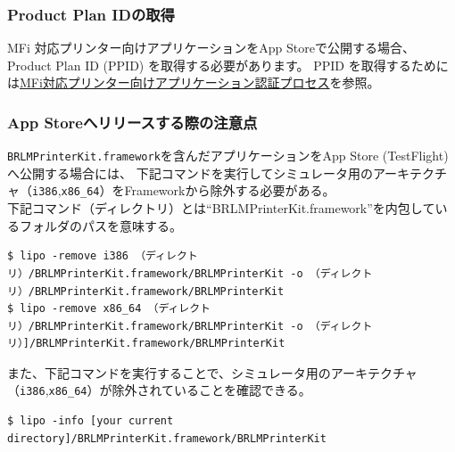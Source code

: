 \documentclass[dvipdfmx,jb5]{jreport}
\newcommand{\link}[2]{\href{#2}{#1}}
\newcommand{\terlogy}[2][|]{\colorbox{terlogy}{\texttt{\lstinline#1#2#1}}}
\begin{document}
\subsubsection{Product Plan IDの取得}
MFi 対応プリンター向けアプリケーションをApp Storeで公開する場合、Product Plan ID (PPID) を取得する必要があります。 PPID を取得するためには\link{MFi対応プリンター向けアプリケーション認証プロセス}{https://online.brother.co.jp/dev/MFiTop.aspx}を参照。
\subsubsection{App Storeへリリースする際の注意点}
\texttt{BRLMPrinterKit.framework}を含んだアプリケーションをApp Store (TestFlight)へ公開する場合には、 下記コマンドを実行してシミュレータ用のアーキテクチャ（\terlogy{i386},\terlogy{x86_64}）をFrameworkから除外する必要がある。\\
下記コマンド（ディレクトリ）とは``BRLMPrinterKit.framework''を内包しているフォルダのパスを意味する。
\begin{lstlisting}
$ lipo -remove i386 （ディレクトリ）/BRLMPrinterKit.framework/BRLMPrinterKit -o （ディレクトリ）/BRLMPrinterKit.framework/BRLMPrinterKit
$ lipo -remove x86_64 （ディレクトリ）/BRLMPrinterKit.framework/BRLMPrinterKit -o （ディレクトリ）]/BRLMPrinterKit.framework/BRLMPrinterKit
  \end{lstlisting}
また、下記コマンドを実行することで、シミュレータ用のアーキテクチャ（\terlogy{i386},\terlogy{x86_64}）が除外されていることを確認できる。
\begin{lstlisting}
$ lipo -info [your current directory]/BRLMPrinterKit.framework/BRLMPrinterKit
  \end{lstlisting}
\end{document}
